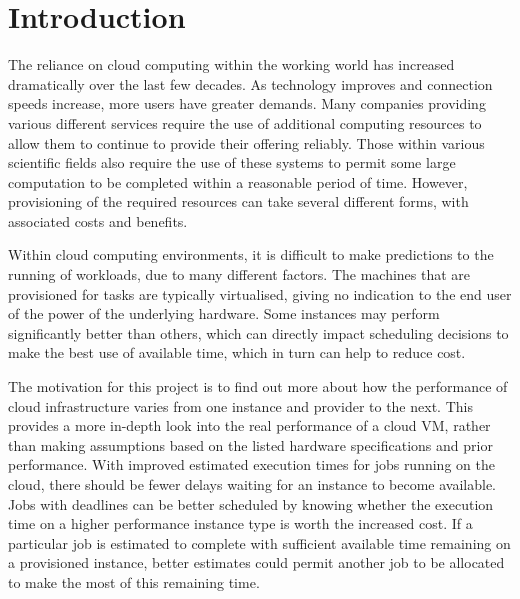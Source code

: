 \documentclass{entcs} \usepackage{entcsmacro}
\begin{document}

\section{Introduction}\label{sec:introduction}

The reliance on cloud computing within the working world has increased dramatically over the last few decades. As technology improves and connection speeds increase, more users have greater demands. Many companies providing various different services require the use of additional computing resources to allow them to continue to provide their offering reliably. Those within various scientific fields also require the use of these systems to permit some large computation to be completed within a reasonable period of time. However, provisioning of the required resources can take several different forms, with associated costs and benefits.

Within cloud computing environments, it is difficult to make predictions to the running of workloads, due to many different factors. The machines that are provisioned for tasks are typically virtualised, giving no indication to the end user of the power of the underlying hardware. Some instances may perform significantly better than others, which can directly impact scheduling decisions to make the best use of available time, which in turn can help to reduce cost.

The motivation for this project is to find out more about how the performance of cloud infrastructure varies from one instance and provider to the next. This provides a more in-depth look into the real performance of a cloud VM, rather than making assumptions based on the listed hardware specifications and prior performance. With improved estimated execution times for jobs running on the cloud, there should be fewer delays waiting for an instance to become available. Jobs with deadlines can be better scheduled by knowing whether the execution time on a higher performance instance type is worth the increased cost. If a particular job is estimated to complete with sufficient available time remaining on a provisioned instance, better estimates could permit another job to be allocated to make the most of this remaining time.
\end{document}
